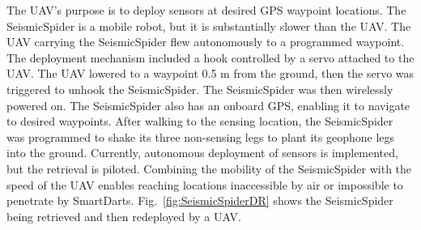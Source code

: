 The UAV's purpose is to deploy sensors at desired GPS waypoint locations. The SeismicSpider is a mobile robot, but it is substantially slower than the UAV.  The UAV carrying the SeismicSpider flew autonomously to a programmed waypoint. The deployment mechanism included a hook controlled by a servo attached to the UAV. The UAV lowered to a waypoint 0.5 m from the ground, then the servo was triggered to unhook the SeismicSpider.  The SeismicSpider was then wirelessly powered on. 
The SeismicSpider also has an onboard GPS, enabling it to navigate to desired waypoints. 
After walking to the sensing location, the SeismicSpider was programmed to shake its three non-sensing legs to plant its geophone legs into the ground.  
  Currently, autonomous deployment of sensors is implemented, but the retrieval is piloted. 
Combining the mobility of the SeismicSpider with the speed of the UAV enables reaching locations inaccessible by air or impossible to penetrate by SmartDarts.
Fig.~\ref{fig:SeismicSpiderDR} shows the SeismicSpider being retrieved and then redeployed by a UAV.





